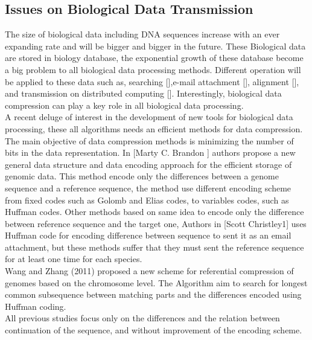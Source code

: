 \documentclass[preprint,12pt]{elsarticle}
\begin{document}
\subsection{Issues on Biological Data Transmission}
The size of biological data including DNA sequences increase with an ever expanding rate and will be bigger and bigger in the future. These Biological data are stored in biology database, the exponential growth of these database become a big problem to all biological data processing methods.
Different operation will be applied to these data such as, searching [],e-mail attachment [], alignment [], and transmission on distributed computing []. Interestingly, biological data compression can play a key role in all biological data processing.\\  
A recent deluge of interest in the development of new tools for biological data processing, these all algorithms needs an efficient methods for data compression. The main objective of data compression methods is minimizing the number of bits in the data representation. 
In [Marty C. Brandon ] authors propose a new general data structure and data encoding approach for the efficient storage of genomic data. This method encode only the differences between a genome sequence and a reference sequence, the method use different encoding scheme from fixed codes such as Golomb and Elias codes, to variables codes, such as Huffman codes. Other methods based on same idea to encode only the difference between reference sequence and the target one, Authors in [Scott Christley1] uses Huffman code for encoding difference between sequence to sent it as an email attachment, but these methods suffer that they must sent the reference sequence for at least one time for each species.\\
Wang and Zhang (2011) proposed a new scheme for referential compression of genomes based on the chromosome level. The Algorithm aim to search for longest common subsequence between matching parts and the differences encoded using Huffman coding.\\
All previous studies focus only on the differences and the relation between continuation of the sequence, and without improvement of the encoding scheme.

\end{document}
